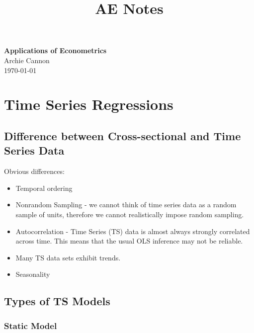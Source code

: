 \documentclass[11pt]{article}
\begin{document}
\title{AE Notes}

\thispagestyle{empty}

\begin{center}
{\LARGE \bf Applications of Econometrics}\\
{\large Archie Cannon}\\
\today
\end{center}
\setcounter{tocdepth}{2}
{
\begin{tcolorbox}[title=Contents, fonttitle=\huge\sffamily\bfseries\selectfont,interior style={left color=codegray,right color=contcol2!40!white},frame style={left color=codegray,right color=contcol2!80!white},coltitle=black,top=2mm,bottom=2mm,left=2mm,right=2mm,drop fuzzy shadow,enhanced,breakable]
\makeatletter
{}
\makeatother
\end{tcolorbox}}

\newpage

\section{Time Series Regressions}
\subsection{Difference between Cross-sectional and Time Series Data}

Obvious differences:
\begin{itemize}
    \item Temporal ordering
    \item Nonrandom Sampling - we cannot think of time series data as a random sample of units, therefore we cannot realistically impose random sampling.
    \item Autocorrelation - Time Series (TS) data is almost always strongly correlated across time. This means that the usual OLS inference may not be reliable.
    \item Many TS data sets exhibit trends.
    \item Seasonality
\end{itemize}

\subsection{Types of TS Models}

\subsubsection*{Static Model}
\end{document}

